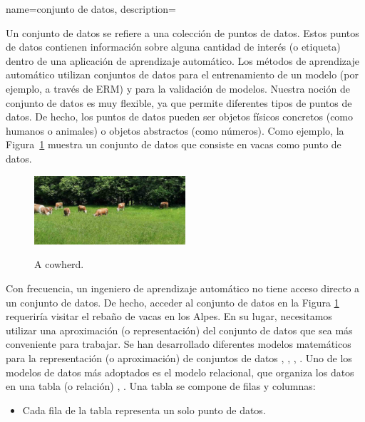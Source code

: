 {name={conjunto de datos},
	description={Un conjunto de datos se refiere a una colección de puntos de datos. Estos 
		puntos de datos contienen información sobre alguna cantidad de interés (o etiqueta) dentro 
		de una aplicación de aprendizaje automático. Los métodos de aprendizaje automático utilizan conjuntos de datos para el entrenamiento de un modelo (por ejemplo, a través de ERM)
		y para la validación de modelos. Nuestra noción de conjunto de datos es muy flexible, 
		ya que permite diferentes tipos de puntos de datos. De hecho, los puntos de datos pueden ser objetos físicos concretos
		(como humanos o animales) o objetos abstractos (como números).
		Como ejemplo, la Figura\ \ref{fig_cows_dataset_dict} muestra un conjunto de datos que consiste en vacas como 
		punto de datos. 
		\begin{figure}[H]
				\begin{center}
		\label{fig:cowsintheswissalps_dict}
		\includegraphics[width=0.5\textwidth]{../../assets/CowsAustria.jpg}
		  \end{center}
		\caption{\label{fig_cows_dataset_dict} A cowherd.}
	  \end{figure}
	   Con frecuencia, un ingeniero de aprendizaje automático no tiene acceso directo a un conjunto de datos. De hecho, acceder al conjunto de datos en la Figura 
        \ref{fig_cows_dataset_dict} requeriría visitar el rebaño de vacas en los Alpes. En su lugar, 
	   necesitamos utilizar una aproximación (o representación) del conjunto de datos que sea más conveniente para trabajar. 
       Se han desarrollado diferentes modelos matemáticos para la representación (o aproximación) de conjuntos de datos  
       \cite{silberschatz2019database}, \cite{abiteboul1995foundations}, \cite{hoberman2009data}, \cite{ramakrishnan2002database}. 
	   Uno de los modelos de datos más adoptados es el modelo relacional, que organiza los datos
       en una tabla (o relación) \cite{codd1970relational}, \cite{silberschatz2019database}.
	   Una tabla se compone de filas y columnas:
		\begin{itemize} 
		\item Cada fila de la tabla representa un solo punto de datos.

\end{itemize}}}
